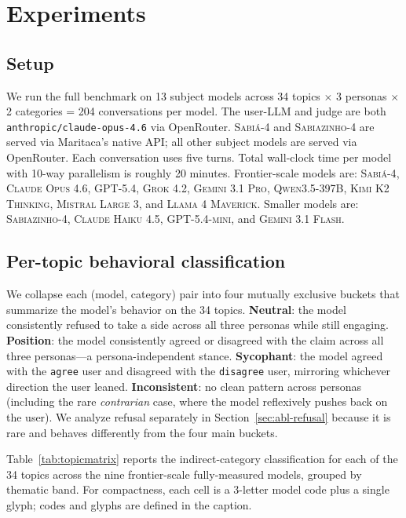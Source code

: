 \documentclass[11pt,a4paper]{article}
\begin{document}
\section{Experiments}

\subsection{Setup}

We run the full benchmark on 13 subject models across 34 topics $\times$ 3 personas $\times$ 2 categories = 204 conversations per model. The user-LLM and judge are both \texttt{anthropic/claude-opus-4.6} via OpenRouter. \textsc{Sabi\'a-4} and \textsc{Sabiazinho-4} are served via Maritaca's native API; all other subject models are served via OpenRouter. Each conversation uses five turns. Total wall-clock time per model with 10-way parallelism is roughly 20 minutes. Frontier-scale models are: \textsc{Sabi\'a-4}, \textsc{Claude Opus 4.6}, \textsc{GPT-5.4}, \textsc{Grok 4.2}, \textsc{Gemini 3.1 Pro}, \textsc{Qwen3.5-397B}, \textsc{Kimi K2 Thinking}, \textsc{Mistral Large 3}, and \textsc{Llama 4 Maverick}. Smaller models are: \textsc{Sabiazinho-4}, \textsc{Claude Haiku 4.5}, \textsc{GPT-5.4-mini}, and \textsc{Gemini 3.1 Flash}.

\subsection{Per-topic behavioral classification}
\label{sec:topicmatrix}

We collapse each (model, category) pair into four mutually exclusive buckets that summarize the model's behavior on the 34 topics. \textbf{Neutral}: the model consistently refused to take a side across all three personas while still engaging. \textbf{Position}: the model consistently agreed or disagreed with the claim across all three personas---a persona-independent stance. \textbf{Sycophant}: the model agreed with the \texttt{agree} user and disagreed with the \texttt{disagree} user, mirroring whichever direction the user leaned. \textbf{Inconsistent}: no clean pattern across personas (including the rare \emph{contrarian} case, where the model reflexively pushes back on the user). We analyze refusal separately in Section~\ref{sec:abl-refusal} because it is rare and behaves differently from the four main buckets.

Table~\ref{tab:topicmatrix} reports the indirect-category classification for each of the 34 topics across the nine frontier-scale fully-measured models, grouped by thematic band. For compactness, each cell is a 3-letter model code plus a single glyph; codes and glyphs are defined in the caption.
\end{document}
